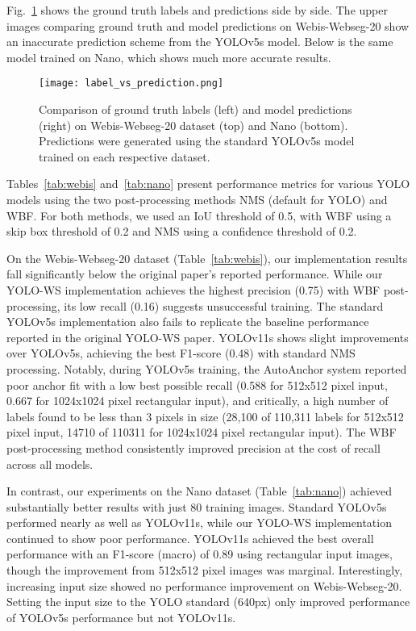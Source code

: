 \documentclass[conference]{IEEEtran}
\begin{document}
Fig.~\ref{fig:labels} shows the ground truth labels and predictions side by side. The upper images comparing ground truth and model predictions on Webis-Webseg-20 show an inaccurate prediction scheme from the YOLOv5s model. Below is the same model trained on Nano, which shows much more accurate results.

\begin{figure}[htbp]
\centerline{\texttt{[image: label\_vs\_prediction.png]}}
\caption{Comparison of ground truth labels (left) and model predictions (right) on Webis-Webseg-20 dataset (top) and Nano (bottom). Predictions were generated using the standard YOLOv5s model trained on each respective dataset.}
\label{fig:labels}
\end{figure}

Tables~\ref{tab:webis} and~\ref{tab:nano} present performance metrics for various YOLO models using the two post-processing methods NMS (default for YOLO) and WBF. For both methods, we used an IoU threshold of 0.5, with WBF using a skip box threshold of 0.2 and NMS using a confidence threshold of 0.2.

On the Webis-Webseg-20 dataset (Table~\ref{tab:webis}), our implementation results fall significantly below the original paper's reported performance. While our YOLO-WS implementation achieves the highest precision (0.75) with WBF post-processing, its low recall (0.16) suggests unsuccessful training. The standard YOLOv5s implementation also fails to replicate the baseline performance reported in the original YOLO-WS paper. YOLOv11s shows slight improvements over YOLOv5s, achieving the best F1-score (0.48) with standard NMS processing. Notably, during YOLOv5s training, the AutoAnchor system reported poor anchor fit with a low best possible recall (0.588 for 512x512 pixel input, 0.667 for 1024x1024 pixel rectangular input), and critically, a high number of labels found to be less than 3 pixels in size (28,100 of 110,311 labels for 512x512 pixel input, 14710 of 110311 for 1024x1024 pixel rectangular input). The WBF post-processing method consistently improved precision at the cost of recall across all models.

In contrast, our experiments on the Nano dataset (Table~\ref{tab:nano}) achieved substantially better results with just 80 training images. Standard YOLOv5s performed nearly as well as YOLOv11s, while our YOLO-WS implementation continued to show poor performance. YOLOv11s achieved the best overall performance with an F1-score (macro) of 0.89 using rectangular input images, though the improvement from 512x512 pixel images was marginal. Interestingly, increasing input size showed no performance improvement on Webis-Webseg-20. Setting the input size to the YOLO standard (640px) only improved performance of YOLOv5s performance but not YOLOv11s.
\end{document}

